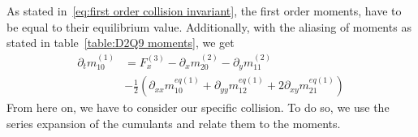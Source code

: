 As stated in~\eqref{eq:first order collision invariant}, the first order moments, have to be equal to their equilibrium value. Additionally, with the aliasing of moments as stated in table~\ref{table:D2Q9 moments}, we get
\begin{equation}
  \begin{aligned}
  \partial_t m_{10}^{(1)}
   & =
    F_x^{(3)}
    - \partial_x m_{20}^{(2)} - \partial_y m_{11}^{(2)} \\
    &
    - \frac{1}{2} \left(\partial_{xx} m_{10}^{eq(1)} + \partial_{yy} m_{12}^{eq(1)} + 2\partial_{xy} m_{21}^{eq(1)}\right)
  \end{aligned}
\end{equation}
From here on, we have to consider our specific collision. To do so, we use the series expansion of the cumulants and relate them to the moments.

